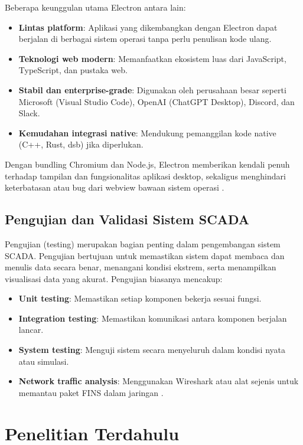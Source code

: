 Beberapa keunggulan utama Electron antara lain:

\begin{itemize}
    \item \textbf{Lintas platform}: Aplikasi yang dikembangkan dengan Electron dapat berjalan di berbagai sistem operasi tanpa perlu penulisan kode ulang.
    \item \textbf{Teknologi web modern}: Memanfaatkan ekosistem luas dari JavaScript, TypeScript, dan pustaka web.
    \item \textbf{Stabil dan enterprise-grade}: Digunakan oleh perusahaan besar seperti Microsoft (Visual Studio Code), OpenAI (ChatGPT Desktop), Discord, dan Slack.
    \item \textbf{Kemudahan integrasi native}: Mendukung pemanggilan kode native (C++, Rust, dsb) jika diperlukan.
\end{itemize}

Dengan bundling Chromium dan Node.js, Electron memberikan kendali penuh terhadap tampilan dan fungsionalitas aplikasi desktop, sekaligus menghindari keterbatasan atau bug dari webview bawaan sistem operasi \parencite{electron2024why}.

\subsection{Pengujian dan Validasi Sistem SCADA}
Pengujian (testing) merupakan bagian penting dalam pengembangan sistem SCADA. Pengujian bertujuan untuk memastikan sistem dapat membaca dan menulis data secara benar, menangani kondisi ekstrem, serta menampilkan visualisasi data yang akurat. Pengujian biasanya mencakup:

\begin{itemize}
    \item \textbf{Unit testing}: Memastikan setiap komponen bekerja sesuai fungsi.
    \item \textbf{Integration testing}: Memastikan komunikasi antara komponen berjalan lancar.
    \item \textbf{System testing}: Menguji sistem secara menyeluruh dalam kondisi nyata atau simulasi.
    \item \textbf{Network traffic analysis}: Menggunakan Wireshark atau alat sejenis untuk memantau paket FINS dalam jaringan \parencite{almas2014open}.
\end{itemize}

\section{Penelitian Terdahulu}

